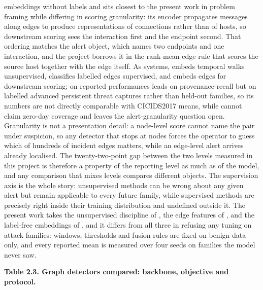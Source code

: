 embeddings without labels and sits closest to the present work in problem framing while differing in scoring granularity: its encoder propagates messages along edges to produce representations of connections rather than of hosts, so downstream scoring sees the interaction first and the endpoint second. That ordering matches the alert object, which names two endpoints and one interaction, and the project borrows it in the rank-mean edge rule that scores the source host together with the edge itself. As systems, \cite{k16} embeds temporal walks unsupervised, \cite{k18} classifies labelled edges supervised, and \cite{k19} embeds edges for downstream scoring; on reported performances \cite{k16} leads on provenance-recall but on labelled advanced persistent threat captures rather than held-out families, so its numbers are not directly comparable with CICIDS2017 means, while \cite{k18} cannot claim zero-day coverage and \cite{k19} leaves the alert-granularity question open. Granularity is not a presentation detail: a node-level score cannot name the pair under suspicion, so any detector that stops at nodes forces the operator to guess which of hundreds of incident edges matters, while an edge-level alert arrives already localised. The twenty-two-point gap between the two levels measured in this project is therefore a property of the reporting level as much as of the model, and any comparison that mixes levels compares different objects. The supervision axis is the whole story: unsupervised methods can be wrong about any given alert but remain applicable to every future family, while supervised methods are precisely right inside their training distribution and undefined outside it. The present work takes the unsupervised discipline of \cite{k16}, the edge features of \cite{k18}, and the label-free embeddings of \cite{k19}, and it differs from all three in refusing any tuning on attack families: windows, thresholds and fusion rules are fixed on benign data only, and every reported mean is measured over four seeds on families the model never saw.

\begin{center}\textbf{Table 2.3. Graph detectors compared: backbone, objective and protocol.}\end{center}

